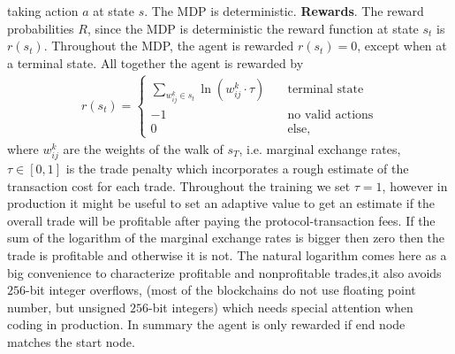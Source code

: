 taking action $a$ at state $s$. The MDP is deterministic.\newline
\textbf{Rewards}. The reward probabilities $R$, since the MDP is
deterministic the reward function at state $s_t$ is $r(s_t)$. Throughout the
MDP, the agent is rewarded $r(s_t) =0$, except when at a terminal state. All
together the agent is rewarded by
\begin{align}
    r(s_t) =
    \begin{cases}
        \sum_{w_{ij}^{k}  \in s_t}\ln(w_{ij}^{k} \cdot \tau)  \quad
        &\text{terminal state}\\
            -1 \quad &\text{no valid actions}\\
            0 \quad &\text{else},
    \end{cases}
\end{align}
where $w_{ij}^{k}$ are the weights of the walk of $s_T$, i.e. marginal
exchange rates, $\tau \in[0, 1]$ is the trade penalty which incorporates a
rough estimate of the transaction cost for each trade. Throughout the
training we set $\tau = 1$, however in production it might be useful to set
an adaptive value to get an estimate if the overall trade will be profitable
after paying the protocol-transaction fees. If the sum of the logarithm of
the marginal exchange rates is bigger then zero then the trade is profitable
and otherwise it is not. The natural logarithm comes here as a big
convenience to characterize profitable and nonprofitable trades,it also
avoids $256$-bit integer overflows, (most of the blockchains do not use
floating point number, but unsigned $256$-bit integers) which needs special
attention when coding in production. In summary the agent is only rewarded if
end node matches the start node.

